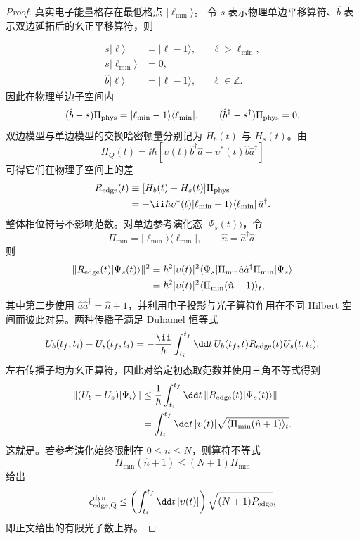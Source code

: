 \begin{proof}
真实电子能量格存在最低格点 $|\ell_{\min}\rangle$。 令 $s$ 表示物理单边平移算符、$\hat b$ 表示双边延拓后的幺正平移算符，则

\begin{align*}
s|\ell\rangle&=|\ell-1\rangle,
&&\ell>\ell_{\min},\\
s|\ell_{\min}\rangle&=0,\\
\hat b|\ell\rangle&=|\ell-1\rangle,
&&\ell\in\mathbb Z.
\end{align*}
因此在物理单边子空间内
\begin{equation*}
(\hat b-s)\Pi_{\rm phys}
=|\ell_{\min}-1\rangle\langle\ell_{\min}|,
\qquad
(\hat b^\dagger-s^\dagger)\Pi_{\rm phys}=0.
\end{equation*}
双边模型与单边模型的交换哈密顿量分别记为 $H_b(t)$ 与 $H_s(t)$。由
\begin{equation*}
H_Q(t)=\ii\hbar[\upsilon(t)\hat b^\dagger\hat a-\upsilon^*(t)\hat b\hat a^\dagger]
\end{equation*}
可得它们在物理子空间上的差
\begin{align*}
R_{\rm edge}(t)
&\equiv[H_b(t)-H_s(t)]\Pi_{\rm phys}\\
&=-\ii\hbar\upsilon^*(t)
|\ell_{\min}-1\rangle\langle\ell_{\min}|\,\hat a^\dagger .
\end{align*}
整体相位符号不影响范数。对单边参考演化态 $|\Psi_s(t)\rangle$，令
\begin{equation*}
\Pi_{\min}=|\ell_{\min}\rangle\langle\ell_{\min}|,
\qquad
\hat n=\hat a^\dagger\hat a.
\end{equation*}
则
\begin{align*}
\|R_{\rm edge}(t)|\Psi_s(t)\rangle\|^2
&=\hbar^2|\upsilon(t)|^2
\langle\Psi_s|
\Pi_{\min}\hat a\hat a^\dagger\Pi_{\min}
|\Psi_s\rangle\\
&=\hbar^2|\upsilon(t)|^2
\langle\Pi_{\min}(\hat n+1)\rangle_t,
\end{align*}
其中第二步使用 $\hat a\hat a^\dagger=\hat n+1$，并利用电子投影与光子算符作用在不同 Hilbert 空间而彼此对易。两种传播子满足 Duhamel 恒等式
\begin{equation*}
U_b(t_f,t_i)-U_s(t_f,t_i)
=-\frac{\ii}{\hbar}
\int_{t_i}^{t_f}\dd t\,
U_b(t_f,t)R_{\rm edge}(t)U_s(t,t_i).
\end{equation*}
左右传播子均为幺正算符，因此对给定初态取范数并使用三角不等式得到
\begin{align*}
\|(U_b-U_s)|\Psi_i\rangle\|
&\le
\frac1\hbar\int_{t_i}^{t_f}\dd t\,
\|R_{\rm edge}(t)|\Psi_s(t)\rangle\|\\
&=
\int_{t_i}^{t_f}\dd t\,|\upsilon(t)|
\sqrt{\langle\Pi_{\min}(\hat n+1)\rangle_t}.
\end{align*}
这就是。若参考演化始终限制在 $0\le n\le N$，则算符不等式
\begin{equation*}
\Pi_{\min}(\hat n+1)
\le (N+1)\Pi_{\min}
\end{equation*}
给出
\begin{equation*}
\epsilon_{\rm edge,Q}^{\rm dyn}
\le
\left(\int_{t_i}^{t_f}\dd t\,|\upsilon(t)|\right)
\sqrt{(N+1)P_{\rm edge}},
\end{equation*}
即正文给出的有限光子数上界。
\end{proof}


